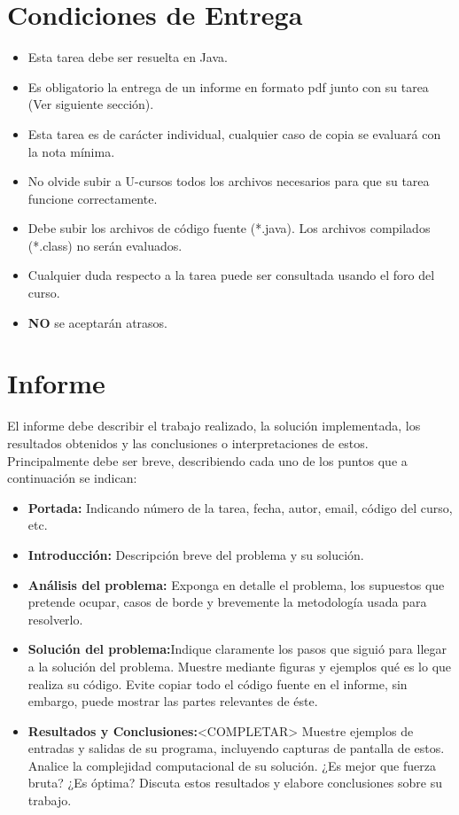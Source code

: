 \documentclass[dcc]{fcfmcourse}
\begin{document}
\section{Condiciones de Entrega}

\begin{itemize}
    \item Esta tarea debe ser resuelta en Java.
    \item Es obligatorio la entrega de un informe en formato pdf junto con su tarea (Ver siguiente sección).
    \item Esta tarea es de carácter individual, cualquier caso de copia se evaluará con la nota mínima.
    \item No olvide subir a U-cursos todos los archivos necesarios para que su tarea funcione correctamente.
    \item Debe subir los archivos de código fuente (*.java). Los archivos compilados (*.class) no serán evaluados.
    \item Cualquier duda respecto a la tarea puede ser consultada usando el foro del curso.
    \item \textbf{NO} se aceptarán atrasos.
\end{itemize}

\section{Informe}

El informe debe describir el trabajo realizado, la solución implementada, los resultados obtenidos
y las conclusiones o interpretaciones de estos. Principalmente debe ser breve, describiendo cada uno
de los puntos que a continuación se indican:

\begin{itemize}
    \item \textbf{Portada:} Indicando número de la tarea, fecha, autor, email, código del curso, etc.
    \item \textbf{Introducción:} Descripción breve del problema y su solución.
    \item \textbf{Análisis del problema:} Exponga en detalle el problema, los supuestos que pretende ocupar, casos de borde y brevemente la metodología usada para resolverlo.
    \item \textbf{Solución del problema:}Indique claramente los pasos que siguió para llegar a la solución
del problema. Muestre mediante figuras y ejemplos qué es lo que realiza su código. Evite
copiar todo el código fuente en el informe, sin embargo, puede mostrar las partes relevantes
de éste.
\item \textbf{Resultados y Conclusiones:}<COMPLETAR> Muestre ejemplos de entradas y salidas de su programa, incluyendo
capturas de pantalla de estos. Analice la complejidad computacional de su solución.
¿Es mejor que fuerza bruta? ¿Es óptima? Discuta estos resultados y elabore conclusiones
sobre su trabajo.
\end{itemize}
\end{document}
